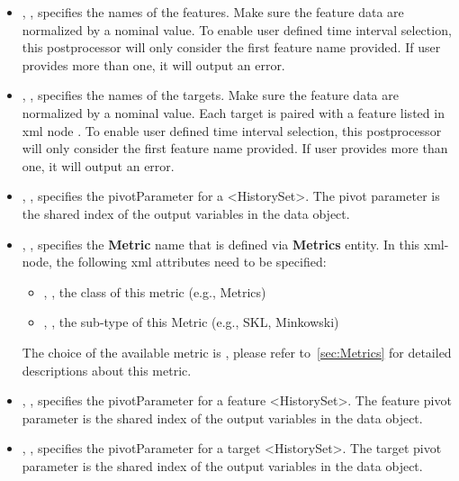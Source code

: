 %
%

\begin{itemize}
  \item {}, , specifies the names of the features. Make sure the feature data are normalized by a nominal value.
    To enable user defined time interval selection, this postprocessor will only consider the first feature name provided. If user provides more than one,
    it will output an error.
  \item {}, , specifies the names of the targets. Make sure the feature data are normalized by a nominal value. \nb Each target is paired with a feature listed in xml node .
    To enable user defined time interval selection, this postprocessor will only consider the first feature name provided. If user provides more than one,
    it will output an error.
  \item {}, , specifies the pivotParameter for a <HistorySet>.
    The pivot parameter is the shared index of the output variables in the data object.
  \item {}, , specifies the \textbf{Metric} name that is defined via
    \textbf{Metrics} entity. In this xml-node, the following xml attributes need to be specified:
    \begin{itemize}
      \item {}, , the class of this metric (e.g., Metrics)
      \item {}, , the sub-type of this Metric (e.g., SKL, Minkowski)
    \end{itemize}
    \nb The choice of the available metric is , please
    refer to~\ref{sec:Metrics} for detailed descriptions about this metric.
    \item {}, , specifies the pivotParameter for a feature <HistorySet>. The feature pivot parameter is the shared index of the output variables in the data object.
    \item {}, , specifies the pivotParameter for a target <HistorySet>. The target pivot parameter is the shared index of the output variables in the data object.

\end{itemize}

